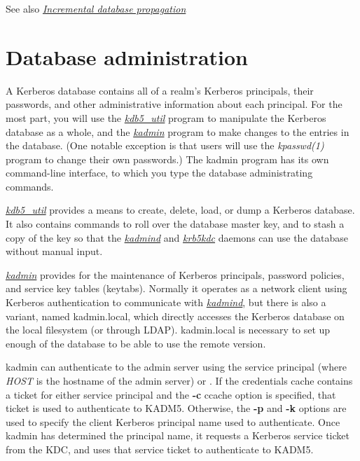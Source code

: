 \documentclass[letterpaper,10pt,english]{sphinxmanual}
\begin{document}
See also {\hyperref[admin/database:incr-db-prop]{\emph{Incremental database propagation}}}


\chapter{Database administration}
\label{admin/database::doc}\label{admin/database:database-administration}
A Kerberos database contains all of a realm's Kerberos principals,
their passwords, and other administrative information about each
principal.  For the most part, you will use the {\hyperref[admin/admin_commands/kdb5_util:kdb5-util-8]{\emph{kdb5\_util}}}
program to manipulate the Kerberos database as a whole, and the
{\hyperref[admin/admin_commands/kadmin_local:kadmin-1]{\emph{kadmin}}} program to make changes to the entries in the
database.  (One notable exception is that users will use the
\emph{kpasswd(1)} program to change their own passwords.)  The kadmin
program has its own command-line interface, to which you type the
database administrating commands.

{\hyperref[admin/admin_commands/kdb5_util:kdb5-util-8]{\emph{kdb5\_util}}} provides a means to create, delete, load, or dump
a Kerberos database.  It also contains commands to roll over the
database master key, and to stash a copy of the key so that the
{\hyperref[admin/admin_commands/kadmind:kadmind-8]{\emph{kadmind}}} and {\hyperref[admin/admin_commands/krb5kdc:krb5kdc-8]{\emph{krb5kdc}}} daemons can use the database
without manual input.

{\hyperref[admin/admin_commands/kadmin_local:kadmin-1]{\emph{kadmin}}} provides for the maintenance of Kerberos principals,
password policies, and service key tables (keytabs).  Normally it
operates as a network client using Kerberos authentication to
communicate with {\hyperref[admin/admin_commands/kadmind:kadmind-8]{\emph{kadmind}}}, but there is also a variant, named
kadmin.local, which directly accesses the Kerberos database on the
local filesystem (or through LDAP).  kadmin.local is necessary to set
up enough of the database to be able to use the remote version.

kadmin can authenticate to the admin server using the service
principal  (where \emph{HOST} is the hostname of the admin
server) or .  If the credentials cache contains a
ticket for either service principal and the \textbf{-c} ccache option is
specified, that ticket is used to authenticate to KADM5.  Otherwise,
the \textbf{-p} and \textbf{-k} options are used to specify the client Kerberos
principal name used to authenticate.  Once kadmin has determined the
principal name, it requests a  Kerberos service ticket
from the KDC, and uses that service ticket to authenticate to KADM5.
\end{document}
